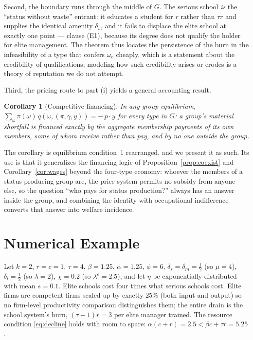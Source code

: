 \documentclass[12pt,letterpaper]{article}
\newtheorem{corollary}{Corollary}
\theoremstyle{definition}
\begin{document}
Second, the boundary runs through the middle of $G$.
The serious school \emph{is} the ``status without waste'' entrant: it educates a student for $r$ rather than $\tau r$ and supplies the identical amenity $\delta_s$, and it fails to displace the elite school at exactly one point --- clause (E1), because its degree does not qualify the holder for elite management.
The theorem thus locates the persistence of the burn in the infeasibility of a type that confers $\omega_e$ cheaply, which is a statement about the credibility of qualifications; modeling how such credibility arises or erodes is a theory of reputation we do not attempt.

Third, the pricing route to part (i) yields a general accounting result.

\begin{corollary}[Competitive financing]\label{cor:financing}
In any group equilibrium, $\sum_{\omega}\pi(\omega)\,q(\omega,(\pi,\gamma,y)) = -\,p\cdot y$ for every type in $G$: a group's material shortfall is financed exactly by the aggregate membership payments of its own members, some of whom receive rather than pay, and by no one outside the group.
\end{corollary}

The corollary is equilibrium condition~1 rearranged, and we present it as such.
Its use is that it generalizes the financing logic of Proposition~\ref{prop:coexist} and Corollary~\ref{cor:wages} beyond the four-type economy: whoever the members of a status-producing group are, the price system permits no subsidy from anyone else, so the question ``who pays for status production?'' always has an answer inside the group, and combining the identity with occupational indifference converts that answer into welfare incidence.

\section{Numerical Example}\label{sec:example}

Let $k=2$, $r=c=1$, $\tau=4$, $\beta=1.25$, $\alpha=1.25$, $\phi=6$, $\delta_s=\delta_m=\tfrac12$ (so $\mu=4$), $\delta_l=\tfrac12$ (so $\lambda=2$), $\chi=0.2$ (so $\lambda^{e}=2.5$), and let $\eta$ be exponentially distributed with mean $s=0.1$.
Elite schools cost four times what serious schools cost.
Elite firms are competent firms scaled up by exactly $25\%$ (both input and output) so no firm-level productivity comparison distinguishes them; the entire drain is the school system's burn, $(\tau-1)r=3$ per elite manager trained.
The resource condition \eqref{eq:decline} holds with room to spare: $\alpha(c+r)=2.5 < \beta c+\tau r = 5.25$.
\end{document}
